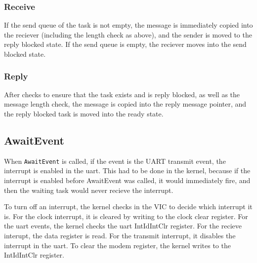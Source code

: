 \documentclass{article}
\begin{document}
\subsubsection{Receive}
    If the send queue of the task is not empty, the message is immediately copied into the reciever (including the length check as above), and the sender is moved to the reply blocked state.
    If the send queue is empty, the reciever moves into the send blocked state.
\subsubsection{Reply}
    After checks to ensure that the task exists and is reply blocked, as well as the message length check, the message is copied into the reply message pointer, and the reply blocked task is moved into the ready state.
\subsection{AwaitEvent} 
When \verb|AwaitEvent| is called, if the event is the UART transmit event, the interrupt is enabled in the uart. This had to be done in the kernel, because if the interrupt is enabled before AwaitEvent was called, it would immediately fire, and then the waiting task would never recieve the interrupt.

To turn off an interrupt, the kernel checks in the VIC to decide which interrupt it is. For the clock interrupt, it is cleared by writing to the clock clear register. For the uart events, the kernel checks the uart IntIdIntClr register. For the recieve interupt, the data register is read. For the transmit interrupt, it disables the interrupt in the uart. To clear the modem register, the kernel writes to the IntIdIntClr register.
\end{document}
